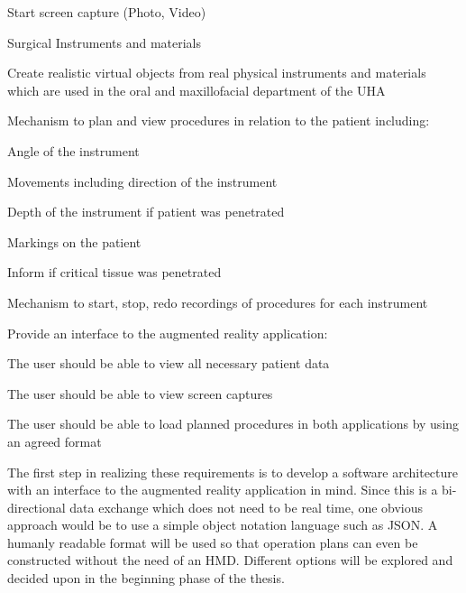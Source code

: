 \begin{compactenum}[label=(\alph*)]
\begin{compactenum}[label=(\alph*)]
            \item Start screen capture (Photo, Video)
        \end{compactenum}
    \item Surgical Instruments and materials
        \begin{compactenum}[label=(\alph*)]
            \item Create realistic virtual objects from real physical instruments and materials which are used in the oral and maxillofacial department of the UHA
            \item Mechanism to plan and view procedures in relation to the patient including:          
                \begin{compactenum}[label=(\alph*)]
                    \item Angle of the instrument
                    \item Movements including direction of the instrument
                    \item Depth of the instrument if patient was penetrated
                    \item Markings on the patient
                    \item Inform if critical tissue was penetrated
                \end{compactenum}
            \item Mechanism to start, stop, redo recordings of procedures for each instrument
        \end{compactenum}
    \item Provide an interface to the augmented reality application:
        \begin{compactenum}[label=(\alph*)]
            \item The user should be able to view all necessary patient data
            \item The user should be able to view screen captures
            \item The user should be able to load planned procedures in both applications by using an agreed format
        \end{compactenum}
\end{compactenum}

The first step in realizing these requirements is to develop a software architecture with an interface to the augmented reality application in mind.
Since this is a bi-directional data exchange which does not need to be real time, one obvious approach would be to use a simple object notation language such as JSON.
A humanly readable format will be used so that operation plans can even be constructed without the need of an HMD.
Different options will be explored and decided upon in the beginning phase of the thesis.

